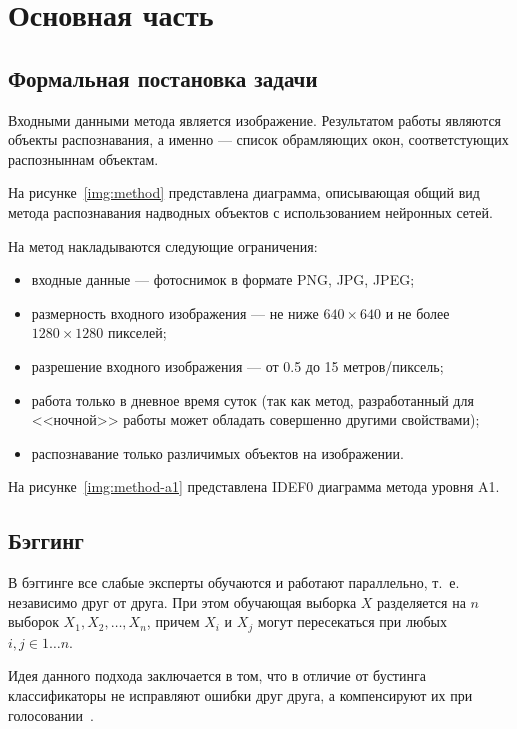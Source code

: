 \chapter{Основная часть}

\section{Формальная постановка задачи}

Входными данными метода является изображение. Результатом работы являются объекты распознавания, а именно --- список обрамляющих окон, соответстующих распозныннам объектам.

На рисунке~\ref{img:method} представлена диаграмма, описывающая общий вид метода распознавания надводных объектов с использованием нейронных сетей.


На метод накладываются следующие ограничения:
\begin{itemize}[label=---]
    \item входные данные --- фотоснимок в формате PNG, JPG, JPEG;
    \item размерность входного изображения --- не ниже $640 \times 640$ и не более $1280 \times 1280$ пикселей;
    \item разрешение входного изображения --- от 0.5 до 15 метров/пиксель;
    \item работа только в дневное время суток (так как метод, разработанный для <<ночной>> работы может обладать совершенно другими свойствами);
    \item распознавание только различимых объектов на изображении.
\end{itemize}

На рисунке~\ref{img:method-a1} представлена IDEF0 диаграмма метода уровня A1.


\section{Бэггинг}

В бэггинге все слабые эксперты обучаются и работают параллельно, т.~е. независимо друг от друга. При этом обучающая выборка $X$ разделяется на $n$ выборок $X_1, X_2, \dots, X_n$, причем $X_i$ и $X_j$ могут пересекаться при любых $i,j \in 1 \dots n$.

Идея данного подхода заключается в том, что в отличие от бустинга классификаторы не исправляют ошибки друг друга, а компенсируют их при голосовании~\cite{ensembles}. 

